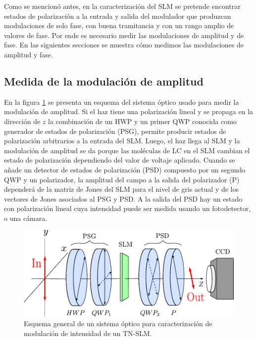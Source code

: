 Como se mencionó antes, en la caracterización del SLM se pretende
encontrar estados de polarización a la entrada y salida del modulador
que produzcan modulaciones de solo fase, con buena tramitancia y con
un rango amplio de valores de fase. 
Por ende es necesario medir las modulaciones de amplitud y de fase. En
las siguientes secciones se muestra cómo medimos las modulaciones de
amplitud y fase. 

\subsection{Medida de la modulación de amplitud}
\label{sec:ChGV_med_mod_amp}

En la figura \ref{fig:PSG_PSD} se presenta un esquema del sistema
óptico usado para medir la modulación de amplitud. Si el haz tiene una
polarización lineal y se propaga en la dirección de $z$ la combinación
de un HWP y un primer QWP conocida como generador de estados de
polarización (PSG), permite producir estados de polarización
arbitrarios a la entrada del SLM. Luego, el haz llega al SLM y la modulación de amplitud se
da porque las moléculas de LC en el SLM cambian el estado de
polarización dependiendo del valor de voltaje aplicado. Cuando se añade un detector de estados de
polarización (PSD) compuesto por un segundo QWP y un polarizador, la amplitud del campo a la salida del polarizador
(P) dependerá de la matriz de Jones del SLM para el nivel de gris
actual y de los vectores de Jones asociados al PSG y PSD. A la salida
del PSD hay un estado con polarización lineal cuya intensidad puede
ser medida usando un fotodetector, o una cámara. 
 \begin{figure}[h!]
\centering
\includegraphics[scale=.8]{PSG_PSD.pdf}
\caption[Esquema de un sistema generador y analizador de estados de
polarización]{Esquema general de un sistema óptico para
  caracterización de modulación de intensidad de un TN-SLM.}
\label{fig:PSG_PSD}
\end{figure}


